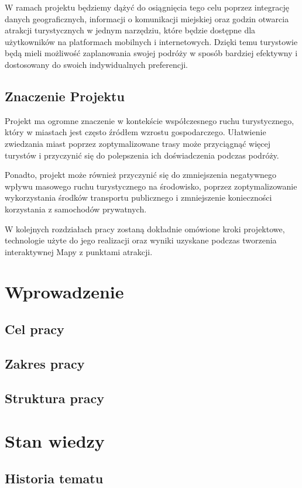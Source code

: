 \documentclass{report}
\begin{document}
	W ramach projektu będziemy dążyć do osiągnięcia tego celu poprzez integrację danych geograficznych, informacji o komunikacji miejskiej oraz godzin otwarcia atrakcji turystycznych w jednym narzędziu, które będzie dostępne dla użytkowników na platformach mobilnych i internetowych. Dzięki temu turystowie będą mieli możliwość zaplanowania swojej podróży w sposób bardziej efektywny i dostosowany do swoich indywidualnych preferencji.
	
	\section{Znaczenie Projektu}
	
	Projekt ma ogromne znaczenie w kontekście współczesnego ruchu turystycznego, który w miastach jest często źródłem wzrostu gospodarczego. Ułatwienie zwiedzania miast poprzez zoptymalizowane trasy może przyciągnąć więcej turystów i przyczynić się do polepszenia ich doświadczenia podczas podróży. 
	
	Ponadto, projekt może również przyczynić się do zmniejszenia negatywnego wpływu masowego ruchu turystycznego na środowisko, poprzez zoptymalizowanie wykorzystania środków transportu publicznego i zmniejszenie konieczności korzystania z samochodów prywatnych.
	
	W kolejnych rozdziałach pracy zostaną dokładnie omówione kroki projektowe, technologie użyte do jego realizacji oraz wyniki uzyskane podczas tworzenia interaktywnej Mapy z punktami atrakcji.
	
	\chapter{Wprowadzenie}
	\section{Cel pracy}
	\section{Zakres pracy}
	\section{Struktura pracy}
	
	\chapter{Stan wiedzy}
	\section{Historia tematu}
\end{document}
